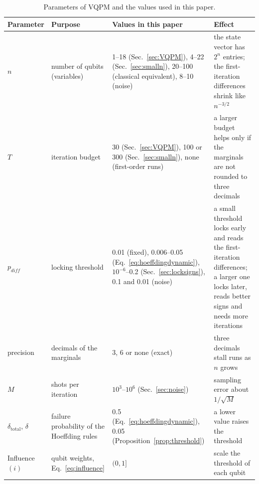 \documentclass[onecolumn,10pt]{article}
\theoremstyle{remark}
\theoremstyle{plain}
\begin{document}
\begin{table}[ht]
\centering
\small
\caption{Parameters of VQPM and the values used in this paper.}
\label{tab:params}
\begin{tabularx}{\textwidth}{Psss}
\toprule
\textbf{Parameter} & \textbf{Purpose} & \textbf{Values in this paper} & \textbf{Effect} \\
\midrule
\(n\) & number of qubits (variables) & 1--18 (Sec.~\ref{sec:VQPM}), 4--22 (Sec.~\ref{sec:smalln}), 20--100 (classical equivalent), 8--10 (noise) & the state vector has \(2^n\) entries; the first-iteration differences shrink like \(n^{-3/2}\) \\
\midrule
\(T\) & iteration budget & 30 (Sec.~\ref{sec:VQPM}), 100 or 300 (Sec.~\ref{sec:smalln}), none (first-order runs) & a larger budget helps only if the marginals are not rounded to three decimals \\
\midrule
\(p_{diff}\) & locking threshold & 0.01 (fixed), 0.006--0.05 (Eq.~\eqref{eq:hoeffdingdynamic}), \(10^{-6}\)--0.2 (Sec.~\ref{sec:locksigns}), 0.1 and 0.01 (noise) & a small threshold locks early and reads the first-iteration differences; a larger one locks later, reads better signs and needs more iterations \\
\midrule
precision & decimals of the marginals & 3, 6 or none (exact) & three decimals stall runs as \(n\) grows \\
\midrule
\(M\) & shots per iteration & \(10^3\)--\(10^6\) (Sec.~\ref{sec:noise}) & sampling error about \(1/\sqrt{M}\) \\
\midrule
\(\delta_{\text{total}}\), \(\delta\) & failure probability of the Hoeffding rules & 0.5 (Eq.~\eqref{eq:hoeffdingdynamic}), 0.05 (Proposition~\ref{prop:threshold}) & a lower value raises the threshold \\
\midrule
Influence\((i)\) & qubit weights, Eq.~\eqref{eq:influence} & \((0,1]\) & scale the threshold of each qubit \\
\bottomrule
\end{tabularx}
\end{table}



\end{document}
